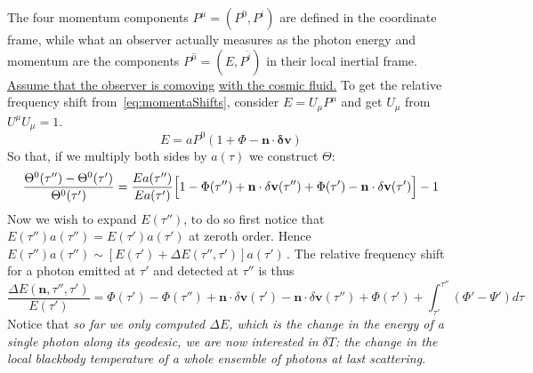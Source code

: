 The four momentum components $P^\mu=(P^0,P^i)$ are defined in the
coordinate frame, while what an observer actually measures as the photon energy
and momentum are the components $P^{\hat{\mu}}=(E,P^{\hat{i}})$ in their local inertial frame. \underline{Assume that the observer is comoving} \underline{with the cosmic fluid.}
To get the relative frequency shift from~\eqref{eq:momentaShifts}, consider $E=U_\mu P^\mu$ and get $U_\mu$ from $U^\mu U_\mu = 1$.
\begin{equation}
    E = aP^{0}\left(1+\Phi-\mathbf{n}\cdot\mathbf{\delta v}\right)
\end{equation}
So that, if we multiply both sides by $a(\tau)$ we construct $\varTheta$:
\begin{equation}
    \frac{\Theta^{0}(\tau'')-\Theta^{0}(\tau')}{\Theta^{0}(\tau')} = \frac{E a(\tau'')}{E a(\tau')}\Bigl[1-\Phi(\tau'')+\mathbf{n}\cdot \delta\mathbf{v}(\tau'')+\Phi(\tau')-\mathbf{n} \cdot \delta\mathbf{v}(\tau')\Bigr] - 1
\end{equation}
Now we wish to expand $E(\tau'')$, to do so first notice that $E(\tau'')a(\tau'')=E(\tau')a(\tau')$ at zeroth order. Hence $E(\tau'')a(\tau'') \sim \left[E(\tau')+ \Delta E(\tau'',\tau')\right]a(\tau')\,$. The relative frequency shift for a photon emitted at $\tau'$ and detected at $\tau''$ is thus
\begin{equation}\label{eq:photonEnergyShift}
    \frac{\Delta E(\mathbf{n},\tau'',\tau')}{E(\tau')} = \Phi(\tau')- \Phi(\tau'') +  \mathbf{n} \cdot \delta\mathbf{v}(\tau') -\mathbf{n}\cdot \delta\mathbf{v}(\tau'')+\Phi(\tau')  + \int_{\tau'}^{\tau''} \left(\Phi'-\Psi'\right)d\tau 
\end{equation}
Notice that \emph{so far we only computed $\Delta E$, which is the change in the energy of a single photon along its geodesic, we are now interested in $\delta T$: the change in the local blackbody temperature of a whole ensemble of photons at last scattering.} 

